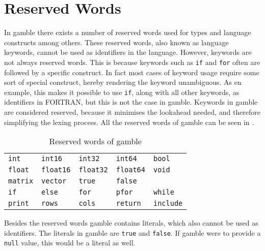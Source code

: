 \section{Reserved Words}

\label{sec:reserved_words}
In \gls{gamble} there exists a number of reserved words used for types and language constructs among others.
These reserved words, also known as language keywords, cannot be used as identifiers in the language. However, keywords are not always reserved words.
This is because keywords such as \texttt{if} and \texttt{for} often are followed by a specific construct.
In fact most cases of keyword usage require some sort of special construct, hereby rendering the keyword unambiguous.
As en example, this makes it possible to use \texttt{if}, along with all other keywords, as identifiers in FORTRAN, but this is not the case in \gls{gamble}.\citep{fortran_identifiers}
Keywords in \gls{gamble} are considered reserved, because it minimises the lookahead needed, and therefore simplifying the lexing process.
All the reserved words of \gls{gamble} can be seen in  .
\begin{table}[h!]
	\centering
	\def\arraystretch{1.5} \setlength{\tabcolsep}{2em}
	\begin{tabular}{l l l l l}
        \texttt{int}     & \texttt{int16}     & \texttt{int32}     & \texttt{int64}     & \texttt{bool}    \\
        \texttt{float}   & \texttt{float16}   & \texttt{float32}   & \texttt{float64}   & \texttt{void}    \\
        \texttt{matrix}  & \texttt{vector}    & \texttt{true}      & \texttt{false}     &                  \\
        \texttt{if}      & \texttt{else}      & \texttt{for}       & \texttt{pfor}      & \texttt{while}   \\
        \texttt{print}   & \texttt{rows}      & \texttt{cols}      & \texttt{return}    & \texttt{include} \\
    \end{tabular}\caption{Reserved words of \gls{gamble}}\label{res:words}
	\def\arraystretch{1}
\end{table}

Besides the reserved words \gls{gamble} contains literals, which also cannot be used as identifiers.
The literals in \gls{gamble} are \texttt{true} and \texttt{false}.
If \gls{gamble} were to provide a \texttt{null} value, this would be a literal as well.

